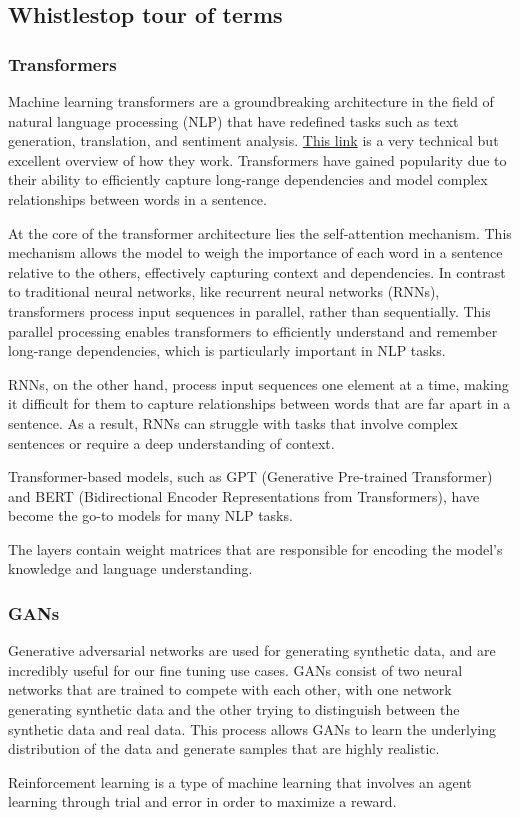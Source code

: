\subsection{Whistlestop tour of terms}
\label{sec:aiterms}
\subsubsection{Transformers}
Machine learning transformers are a groundbreaking architecture in the field of natural language processing (NLP) that have redefined tasks such as text generation, translation, and sentiment analysis. \href{https://docs.google.com/presentation/d/1ZXFIhYczos679r70Yu8vV9uO6B1J0ztzeDxbnBxD1S0/edit#slide=id.g13dd67c5ab8_0_2648}{This link} is a very technical but excellent overview of how they work. Transformers have gained popularity due to their ability to efficiently capture long-range dependencies and model complex relationships between words in a sentence.\par 
At the core of the transformer architecture lies the self-attention mechanism. This mechanism allows the model to weigh the importance of each word in a sentence relative to the others, effectively capturing context and dependencies. In contrast to traditional neural networks, like recurrent neural networks (RNNs), transformers process input sequences in parallel, rather than sequentially. This parallel processing enables transformers to efficiently understand and remember long-range dependencies, which is particularly important in NLP tasks.\par
RNNs, on the other hand, process input sequences one element at a time, making it difficult for them to capture relationships between words that are far apart in a sentence. As a result, RNNs can struggle with tasks that involve complex sentences or require a deep understanding of context.\par
Transformer-based models, such as GPT (Generative Pre-trained Transformer) and BERT (Bidirectional Encoder Representations from Transformers), have become the go-to models for many NLP tasks.\par
The layers contain weight matrices that are responsible for encoding the model's knowledge and language understanding. \par 

\subsubsection{GANs}
Generative adversarial networks are used for generating synthetic data, and are incredibly useful for our fine tuning use cases. GANs consist of two neural networks that are trained to compete with each other, with one network generating synthetic data and the other trying to distinguish between the synthetic data and real data. This process allows GANs to learn the underlying distribution of the data and generate samples that are highly realistic.\par
Reinforcement learning is a type of machine learning that involves an agent learning through trial and error in order to maximize a reward. 
